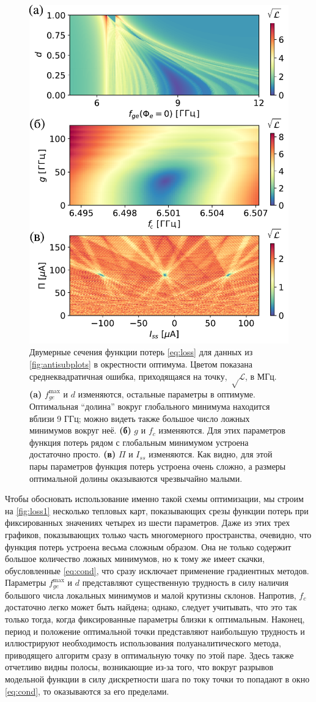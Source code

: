 \documentclass[14pt, a4paper]{extreport}
\numberwithin{equation}{section}
\begin{document}
\begin{figure}[t!]
	\centering
	\includegraphics[width=0.6\linewidth]{Pictures/loss1}
	\caption{Двумерные сечения функции потерь \eqref{eq:loss} для данных из \autoref{fig:antisubplots} в окрестности оптимума. Цветом показана среднеквадратичная ошибка, приходящаяся на точку, $\sqrt\mathcal{L}$, в МГц. \textbf{(a)} $f_{ge}^\text{max}$ и $d$ изменяются, остальные параметры в оптимуме. Оптимальная ``долина'' вокруг глобального минимума находится вблизи 9 ГГц; можно видеть также большое число ложных минимумов вокруг неё. \textbf{(б)} $g$ и $f_c$ изменяются. Для этих параметров функция потерь рядом с глобальным минимумом устроена достаточно просто. \textbf{(в)} $\Pi$ и $I_{ss}$ изменяются. Как видно, для этой пары параметров функция потерь устроена очень сложно, а размеры оптимальной долины оказываются чрезвычайно малыми.}
	\label{fig:loss1}
\end{figure}

Чтобы обосновать использование именно такой схемы оптимизации, мы строим на \autoref{fig:loss1} несколько тепловых карт, показывающих срезы функции потерь при фиксированных значениях четырех из шести параметров. Даже из этих трех графиков, показывающих только часть многомерного пространства, очевидно, что функция потерь устроена весьма сложным образом. Она не только содержит большое количество ложных минимумов, но к тому же имеет скачки, обусловленные \eqref{eq:cond}, что сразу исключает применение градиентных методов. Параметры $f_{ge}^\text{max}$ и $d$ представляют существенную трудность в силу наличия большого числа локальных минимумов и малой крутизны склонов. Напротив, $f_c$ достаточно легко может быть найдена; однако, следует учитывать, что это так только тогда, когда фиксированные параметры близки к оптимальным. Наконец, период и положение оптимальной точки представляют наибольшую трудность и иллюстрируют необходимость использования полуаналитического метода, приводящего алгоритм сразу в оптимальную точку по этой паре. Здесь также отчетливо видны полосы, возникающие из-за того, что вокруг разрывов модельной функции в силу дискретности шага по току точки то попадают в окно \eqref{eq:cond}, то оказываются за его пределами.
\end{document}

